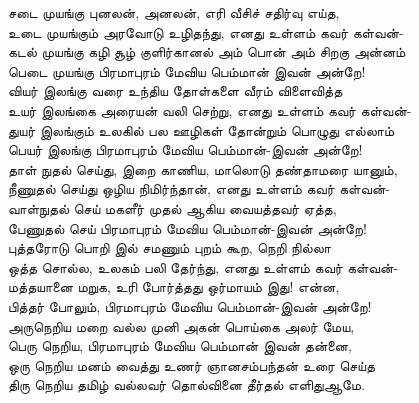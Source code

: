 \documentclass{article} \usepackage{polyglossia}
\begin{document}
{சடை முயங்கு புனலன், அனலன், எரி வீசிச் சதிர்வு எய்த, \\
உடை முயங்கும் அரவோடு உழிதந்து, எனது உள்ளம் கவர் கள்வன்- \\
கடல் முயங்கு கழி சூழ் குளிர்கானல் அம் பொன் அம் சிறகு அன்னம் \\
பெடை முயங்கு பிரமாபுரம் மேவிய பெம்மான் இவன் அன்றே! \\


வியர் இலங்கு வரை உந்திய தோள்களை வீரம் விளைவித்த \\
உயர் இலங்கை அரையன் வலி செற்று, எனது உள்ளம் கவர் கள்வன்- \\
துயர் இலங்கும் உலகில் பல ஊழிகள் தோன்றும் பொழுது எல்லாம் \\
பெயர் இலங்கு பிரமாபுரம் மேவிய பெம்மான்-இவன் அன்றே! \\

தாள் நுதல் செய்து, இறை காணிய, மாலொடு தண்தாமரை யானும், \\
நீணுதல் செய்து ஒழிய நிமிர்ந்தான், எனது உள்ளம் கவர் கள்வன்- \\
வாள்நுதல் செய் மகளீர் முதல் ஆகிய வையத்தவர் ஏத்த, \\
பேணுதல் செய் பிரமாபுரம் மேவிய பெம்மான்-இவன் அன்றே! \\

புத்தரோடு பொறி இல் சமணும் புறம் கூற, நெறி நில்லா \\
ஒத்த சொல்ல, உலகம் பலி தேர்ந்து, எனது உள்ளம் கவர் கள்வன்- \\
மத்தயானை மறுக, உரி போர்த்தது ஒர்மாயம் இது! என்ன, \\
பித்தர் போலும், பிரமாபுரம் மேவிய பெம்மான்-இவன் அன்றே! \\


அருநெறிய மறை வல்ல முனி அகன் பொய்கை அலர் மேய, \\
பெரு நெறிய, பிரமாபுரம் மேவிய பெம்மான் இவன் தன்னை, \\
ஒரு நெறிய மனம் வைத்து உணர் ஞானசம்பந்தன் உரை செய்த \\
திரு நெறிய தமிழ் வல்லவர் தொல்வினை தீர்தல் எளிதுஆமே. \\
}
\end{document}
